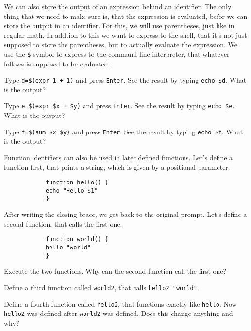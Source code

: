 \begin{challenge}
    \begin{task}
        We can also store the output of an expression behind an identifier.
        The only thing that we need to make sure is, that the expression is evaluated, befor we can store the output in an identifier.
        For this, we will use parentheses, just like in regular math. 
        In addtion to this we want to express to the shell, that it's not just supposed to store the parentheses, but to actually evaluate the expression.
        We use the \texttt{\$}-symbol to express to the command line interpreter, that whatever follows is supposed to be evaluated.
        \begin{questions}
            \item Type \texttt{d=\$(expr 1 + 1)} and press \texttt{Enter}. See the result by typing \texttt{echo \$d}. What is the output?
            \item Type \texttt{e=\$(expr \$x + \$y)} and press \texttt{Enter}. See the result by typing \texttt{echo \$e}. What is the output?
            \item Type \texttt{f=\$(sum \$x \$y)} and press \texttt{Enter}. See the result by typing \texttt{echo \$f}. What is the output?
        \end{questions}
    \end{task}

    \begin{task}
        Function identifiers can also be used in later defined functions.
        Let's define a function first, that prints a string, which is given by a positional parameter.
        \begin{lstlisting}
            function hello() {
            echo "Hello $1"
            }
        \end{lstlisting}
        After writing the closing brace, we get back to the original prompt. 
        Let's define a second function, that calls the first one.
        \begin{lstlisting}
            function world() {
            hello "world"    
            }
        \end{lstlisting}
        
        \begin{questions}
            \item Execute the two functions. Why can the second function call the first one?
            \item Define a third function called \texttt{world2}, that calls \texttt{hello2 "world"}.
            \item Define a fourth function called \texttt{hello2}, that functions exactly like \texttt{hello}. Now \texttt{hello2} was defined after \texttt{world2} was defined. Does this change anything and why?
        \end{questions}
    \end{task}


\end{challenge}
